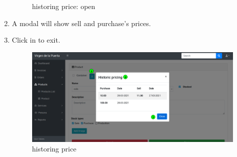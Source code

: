 \documentclass[a4paper,11pt]{refart}
\begin{document}
\begin{enumerate}
\begin{figure}[H]
		\caption{historing price: open}
		\label{fig:historing_price-open}
	\end{figure}
	\item A modal will show sell and purchase's prices.
	\item Click in  to exit.
	\begin{figure}[H]\centering
		\includegraphics[width=\textwidth]{images/historing_price-modal.png}
		\caption{historing price}
		\label{fig:historing_price-modal}
	\end{figure}
	
\end{enumerate}	

\end{document}

